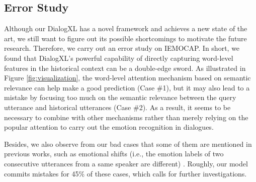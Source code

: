 \documentclass[letterpaper]{article} \usepackage{aaai21}  \usepackage{times}  \usepackage{helvet} \usepackage{courier}  \usepackage[hyphens]{url}  \usepackage{graphicx} \usepackage{amstext}
\begin{document}
\begin{table}[h]
	\centering
	\caption{Results of comparison between direct speaker role embedding and our speaker\&listener self-attention approach on the IEMOCAP and DailyDialog datasets.}
	\label{tab:speker_role}
\end{table}


\subsection{Error Study}
Although our DialogXL has a novel framework and achieves a new state of the art, we still want to figure out its possible shortcomings to motivate the future research. Therefore, we carry out an error study on IEMOCAP. In short, we found that DialogXL's powerful capability of directly capturing word-level features in the historical context can be a double-edge sword. As illustrated in Figure \ref{fig:visualization}, the word-level attention mechanism based on semantic relevance can help make a good prediction (Case \#1), but it may also lead to a mistake by focusing too much on the semantic relevance between the query utterance and historical utterances (Case \#2). As a result, it seems to be necessary to combine with other mechanisms rather than merely relying on the popular attention to carry out the emotion recognition in dialogues.



Besides, we also observe from our bad cases that some of them are mentioned in previous works, such as emotional shifts (i.e., the emotion labels of two consecutive utterances from a same speaker are different)  \cite{hazarika2018conversational, majumder2019dialoguernn}. Roughly, our model commits mistakes for 45\% of these cases, which calls for further investigations. 
\end{document}
